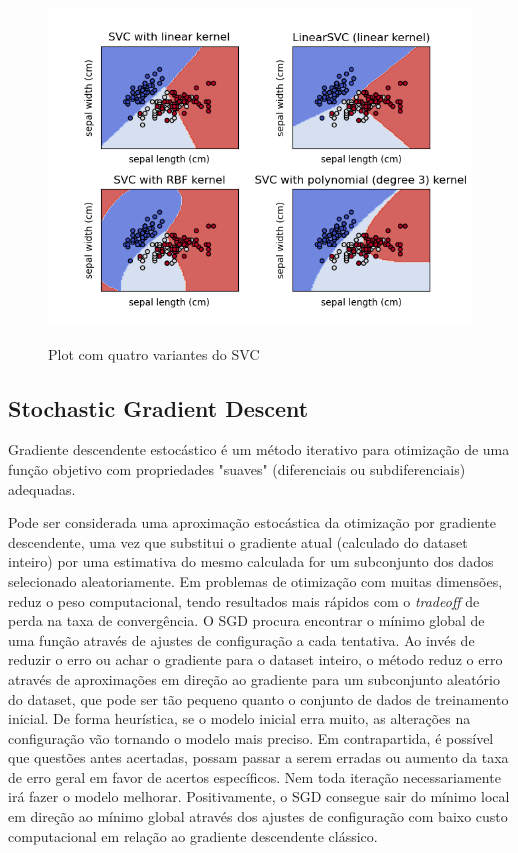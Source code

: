 \begin{figure}[ht]
    \centering
    \caption{Plot com quatro variantes do SVC}
    \includegraphics[width=14cm]{figuras/plot-svc.png} 
    \label{fig:internet} 
\end{figure}

\subsection{Stochastic Gradient Descent}

Gradiente descendente estocástico é um método iterativo para otimização de uma função objetivo com propriedades "suaves" (diferenciais ou subdiferenciais) adequadas. \cite{ruder2016overview}

Pode ser considerada uma aproximação estocástica da otimização por gradiente descendente, uma vez que substitui o gradiente atual (calculado do dataset inteiro) por uma estimativa do mesmo calculada for um subconjunto dos dados selecionado aleatoriamente.
Em problemas de otimização com muitas dimensões, reduz o peso computacional, tendo resultados mais rápidos com o \textit{tradeoff} de perda na taxa de convergência.
O SGD procura encontrar o mínimo global de uma função através de ajustes de configuração a cada tentativa. Ao invés de reduzir o erro ou achar o gradiente para o dataset inteiro, o método reduz o erro através de aproximações em direção ao gradiente para um subconjunto aleatório do dataset, que pode ser tão pequeno quanto o conjunto de dados de treinamento inicial.
De forma heurística, se o modelo inicial erra muito, as alterações na configuração vão tornando o modelo mais preciso. Em contrapartida, é possível que questões antes acertadas, possam passar a serem erradas ou aumento da taxa de erro geral em favor de acertos específicos. Nem toda iteração necessariamente irá fazer o modelo melhorar.
Positivamente, o SGD consegue sair do mínimo local em direção ao mínimo global através dos ajustes de configuração com baixo custo computacional em relação ao gradiente descendente clássico.
\cite{overview_gradient_descent_stochastic}

